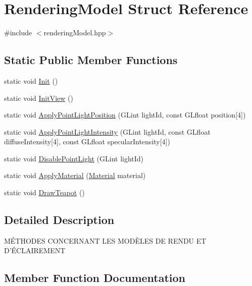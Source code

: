 \hypertarget{struct_rendering_model}{}\section{Rendering\+Model Struct Reference}
\label{struct_rendering_model}


{\ttfamily \#include $<$rendering\+Model.\+hpp$>$}

\subsection*{Static Public Member Functions}
\begin{DoxyCompactItemize}
\item 
static void \hyperlink{struct_rendering_model_aacbef0bb16dc69563ec64034f31acd58}{Init} ()
\item 
static void \hyperlink{struct_rendering_model_adabaa9b1f8ba171e50a62f4ef78ff28b}{Init\+View} ()
\item 
static void \hyperlink{struct_rendering_model_a0b2c2babe4ea5154ef783e229729f1c9}{Apply\+Point\+Light\+Position} (G\+Lint light\+Id, const G\+Lfloat position\mbox{[}4\mbox{]})
\item 
static void \hyperlink{struct_rendering_model_aadeef00a15e4310a0f0ea69f87884735}{Apply\+Point\+Light\+Intensity} (G\+Lint light\+Id, const G\+Lfloat diffuse\+Intensity\mbox{[}4\mbox{]}, const G\+Lfloat specular\+Intensity\mbox{[}4\mbox{]})
\item 
static void \hyperlink{struct_rendering_model_a00bf18c5a373fbd8d80edebd093362df}{Disable\+Point\+Light} (G\+Lint light\+Id)
\item 
static void \hyperlink{struct_rendering_model_a561385fa01420555b97f2bf22912eae6}{Apply\+Material} (\hyperlink{struct_material}{Material} material)
\item 
static void \hyperlink{struct_rendering_model_ad70a68f53f3d8f9802677fa21b5b9c16}{Draw\+Teapot} ()
\end{DoxyCompactItemize}


\subsection{Detailed Description}
MÉ\+T\+H\+O\+D\+ES C\+O\+N\+C\+E\+R\+N\+A\+NT L\+ES M\+O\+DÈ\+L\+ES DE R\+E\+N\+DU ET D’É\+C\+L\+A\+I\+R\+E\+M\+E\+NT 

\subsection{Member Function Documentation}
